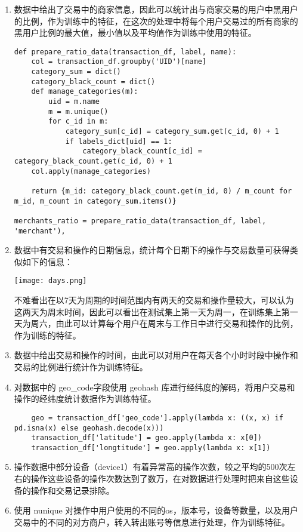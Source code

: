 \documentclass[12pt]{article}
\begin{document}
\begin{enumerate}
    \item 数据中给出了交易中的商家信息，因此可以统计出与商家交易的用户中黑用户的比例，作为训练中的特征，在这次的处理中将每个用户交易过的所有商家的黑用户比例的最大值，最小值以及平均值作为训练中使用的特征。
    
    \begin{lstlisting}
def prepare_ratio_data(transaction_df, label, name):
    col = transaction_df.groupby('UID')[name]
    category_sum = dict()
    category_black_count = dict()
    def manage_categories(m):
        uid = m.name
        m = m.unique()
        for c_id in m:
            category_sum[c_id] = category_sum.get(c_id, 0) + 1
            if labels_dict[uid] == 1:
                category_black_count[c_id] = category_black_count.get(c_id, 0) + 1
    col.apply(manage_categories)
        
    return {m_id: category_black_count.get(m_id, 0) / m_count for m_id, m_count in category_sum.items()}

merchants_ratio = prepare_ratio_data(transaction_df, label, 'merchant'),
    \end{lstlisting}

    \item 数据中有交易和操作的日期信息，统计每个日期下的操作与交易数量可获得类似如下的信息：
    \begin{center}
        \texttt{[image: days.png]}
    \end{center}
    不难看出在以7天为周期的时间范围内有两天的交易和操作量较大，可以认为这两天为周末时间，因此可以看出在测试集上第一天为周一，在训练集上第一天为周六，由此可以计算每个用户在周末与工作日中进行交易和操作的比例，作为训练的特征。

    \item 数据中给出交易和操作的时间，由此可以对用户在每天各个小时时段中操作和交易的比例进行统计作为训练特征。
    
    \item 对数据中的 geo\_code字段使用 geohash 库进行经纬度的解码，将用户交易和操作的经纬度统计数据作为训练特征。
    \begin{lstlisting}
    geo = transaction_df['geo_code'].apply(lambda x: ((x, x) if pd.isna(x) else geohash.decode(x)))
    transaction_df['latitude'] = geo.apply(lambda x: x[0])
    transaction_df['longtitude'] = geo.apply(lambda x: x[1])
    \end{lstlisting}
    \item 操作数据中部分设备（device1）有着异常高的操作次数，较之平均的500次左右的操作这些设备的操作次数达到了数万，在对数据进行处理时把来自这些设备的操作和交易记录排除。
    \item 使用 nunique 对操作中用户使用的不同的os，版本号，设备等数量，以及用户交易中的不同的对方商户，转入转出账号等信息进行处理，作为训练特征。
    

\end{enumerate}
\end{document}
